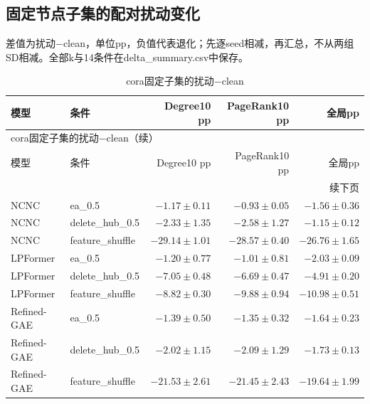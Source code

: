 \documentclass[UTF8,a4paper,11pt,fontset=fandol]{ctexart}
\begin{document}
\subsection{固定节点子集的配对扰动变化}
差值为扰动−clean，单位pp，负值代表退化；先逐seed相减，再汇总，不从两组SD相减。全部k与14条件在delta\_summary.csv中保存。
{\footnotesize
\setlength{\tabcolsep}{3pt}
\begin{longtable}{llrrr}
\caption{cora固定子集的扰动−clean}\\
\toprule
模型 & 条件 & Degree10 pp & PageRank10 pp & 全局pp \\
\midrule
\endfirsthead
\multicolumn{5}{l}{cora固定子集的扰动−clean（续）}\\
\toprule
模型 & 条件 & Degree10 pp & PageRank10 pp & 全局pp \\
\midrule
\endhead
\midrule\multicolumn{5}{r}{续下页}\\
\endfoot
\bottomrule\endlastfoot
NCNC & ea\_0.5 & $-1.17\pm0.11$ & $-0.93\pm0.05$ & $-1.56\pm0.36$ \\
NCNC & delete\_hub\_0.5 & $-2.33\pm1.35$ & $-2.58\pm1.27$ & $-1.15\pm0.12$ \\
NCNC & feature\_shuffle & $-29.14\pm1.01$ & $-28.57\pm0.40$ & $-26.76\pm1.65$ \\
LPFormer & ea\_0.5 & $-1.20\pm0.77$ & $-1.01\pm0.81$ & $-2.03\pm0.09$ \\
LPFormer & delete\_hub\_0.5 & $-7.05\pm0.48$ & $-6.69\pm0.47$ & $-4.91\pm0.20$ \\
LPFormer & feature\_shuffle & $-8.82\pm0.30$ & $-9.88\pm0.94$ & $-10.98\pm0.51$ \\
Refined-GAE & ea\_0.5 & $-1.39\pm0.50$ & $-1.35\pm0.32$ & $-1.64\pm0.23$ \\
Refined-GAE & delete\_hub\_0.5 & $-2.02\pm1.15$ & $-2.09\pm1.29$ & $-1.73\pm0.13$ \\
Refined-GAE & feature\_shuffle & $-21.53\pm2.61$ & $-21.45\pm2.43$ & $-19.64\pm1.99$ \\
\end{longtable}
}
\end{document}
